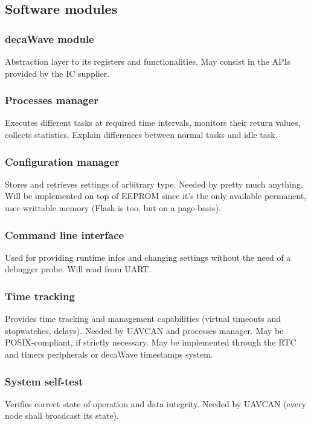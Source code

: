 \subsection{Software modules}



\subsubsection{decaWave module}
Abstraction layer to its registers and functionalities.
May consist in the APIs provided by the IC supplier.

\subsubsection{Processes manager}
Executes different tasks at required time intervals, monitors their return values, collects statistics.
Explain differences between normal tasks and idle task.

\subsubsection{Configuration manager}
Stores and retrieves settings of arbitrary type.
Needed by pretty much anything.
Will be implemented on top of EEPROM since it's the only available permanent, user-writtable memory (Flash is too, but on a page-basis).

\subsubsection{Command line interface}
Used for providing runtime infos and changing settings without the need of a debugger probe.
Will read from UART.

\subsubsection{Time tracking}
Provides time tracking and management capabilities (virtual timeouts and stopwatches, delays).
Needed by UAVCAN and processes manager.
May be POSIX-compliant, if strictly necessary.
May be implemented through the RTC and timers peripherals or decaWave timestamps system.

\subsubsection{System self-test}
Verifies correct state of operation and data integrity.
Needed by UAVCAN (every node shall broadcast its state).





